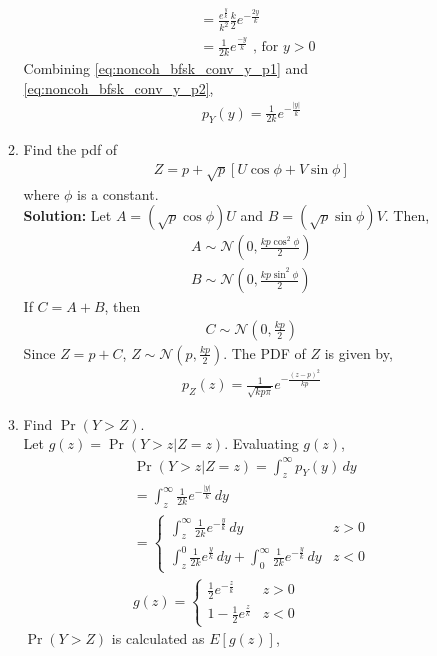 \documentclass[journal,10pt,twocolumn]{IEEEtran}
\providecommand{\pr}[1]{\ensuremath{\Pr\left(#1\right)}}
\providecommand{\sbrak}[1]{\ensuremath{{}\left[#1\right]}}
\providecommand{\brak}[1]{\ensuremath{\left(#1\right)}}
\providecommand{\abs}[1]{\left\vert#1\right\vert}
\newcommand{\solution}{\noindent \textbf{Solution: }}
\providecommand{\gauss}[2]{\mathcal{N}\ensuremath{\left(#1,#2\right)}}
\begin{document}
\begin{enumerate}
\begin{enumerate}[label=(\alph{enumii})]
\begin{align}
	&= \frac{e^{\frac{y}{k}}}{k^2} \frac{k}{2}e^{-\frac{2y}{k}}\\
	\label{eq:noncoh_bfsk_conv_y_p2}
	&= \frac{1}{2k}e^{\frac{-y}{k}} \text{ , for $y > 0$}
\end{align}
Combining \eqref{eq:noncoh_bfsk_conv_y_p1} and \eqref{eq:noncoh_bfsk_conv_y_p2},
\begin{align}
p_{Y}(y) = \frac{1}{2k}e^{-\frac{\abs{y}}{k}}
\end{align}
%
\item 
 Find the pdf of 
%
\begin{align}
Z = p + \sqrt{p}\sbrak{U \cos \phi + V \sin \phi}
\end{align}
%
where $\phi$ is a constant.\\
\solution Let $A = \brak{\sqrt{p}\cos \phi} U$ and $B = \brak{\sqrt{p}\sin \phi} V$. Then,
\begin{align}
	A \sim \gauss{0}{\frac{kp \cos^2\phi}{2}}\\
	B \sim \gauss{0}{\frac{kp \sin^2\phi}{2}}
\end{align} 
If $C=A+B$, then
\begin{align}
	C \sim \gauss{0}{\frac{kp}{2}}
\end{align}
Since $Z=p+C$, $Z \sim \gauss{p}{\frac{kp}{2}}$. The PDF of $Z$ is given by,
\begin{align}
	p_{Z}\brak{z} = \frac{1}{\sqrt{kp\pi}}e^{-\frac{\brak{z-p}^2}{kp}}
\end{align}
\item 
Find $\pr{Y > Z}$.\\
Let $g\brak{z} = \pr{Y > z|Z = z}$. Evaluating $g\brak{z}$,
\begin{align}
	\pr{Y > z|Z = z} = \int_{z}^{\infty} p_Y\brak{y} \,dy\\
	= \int_{z}^{\infty} \frac{1}{2k}e^{-\frac{\abs{y}}{k}} \,dy\\
	=
	\begin{cases}
		\int_{z}^{\infty} \frac{1}{2k}e^{-\frac{y}{k}} \,dy & z > 0\\
		\int_{z}^{0} \frac{1}{2k}e^{\frac{y}{k}} \,dy + \int_{0}^{\infty} \frac{1}{2k}e^{-\frac{y}{k}}\,dy & z < 0
	\end{cases}\\
	g\brak{z} =
	\begin{cases}
		\frac{1}{2}e^{-\frac{z}{k}} & z > 0\\
		1-\frac{1}{2}e^{\frac{z}{k}}  & z < 0
	\end{cases}
\end{align}
$\pr{Y > Z}$ is calculated as $E\sbrak{g\brak{z}}$,

\end{enumerate}
\end{enumerate}
\end{document}
